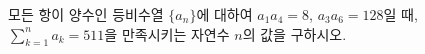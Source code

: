 모든 항이 양수인 등비수열 $\{a_n\}$에 대하여 $a_1a_4=8$, $a_3a_6=128$일 때, $\displaystyle\sum_{k=1}^{n} a_k=511$을 만족시키는 자연수 $n$의 값을 구하시오.
